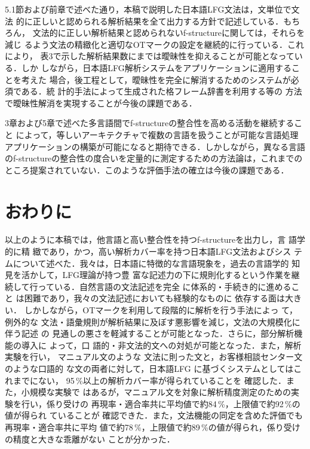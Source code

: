 5.1節および前章で述べた通り，本稿で説明した日本語LFG文法は，文単位で文法
的に正しいと認められる解析結果を全て出力する方針で記述している．もちろん，
文法的に正しい解析結果と認められないf-structureに関しては，それらを減じ
るよう文法の精緻化と適切なOTマークの設定を継続的に行っている．これにより，
表3で示した解析結果数にまでは曖昧性を抑えることが可能となっている．しか
しながら，日本語LFG解析システムをアプリケーションに適用することを考えた
場合，後工程として，曖昧性を完全に解消するためのシステムが必須である．統
計的手法によって生成された格フレーム辞書\cite{kawahara2002}を利用する等の
方法で曖昧性解消を実現することが今後の課題である．

3章および5章で述べた多言語間でf-structureの整合性を高める活動を継続すること
によって，等しいアーキテクチャで複数の言語を扱うことが可能な言語処理
アプリケーションの構築が可能になると期待できる．しかしながら，異なる言語
のf-structureの整合性の度合いを定量的に測定するための方法論は，これまでの
ところ提案されていない．このような評価手法の確立は今後の課題である．

\section{おわりに}
以上のように本稿では，他言語と高い整合性を持つf-structureを出力し，言
語学的に精\break
緻であり，かつ，高い解析カバー率を持つ日本語LFG文法およびシス
テムについて述べた．我々は，日本語に特徴的な言語現象を，過去の言語学的
知見を活かして，LFG理論が持つ豊\break
富な記述力の下に規則化するという作業を継
続して行っている．自然言語の文法記述を完全\break
に体系的・手続き的に進めること
は困難であり，我々の文法記述においても経験的なものに\break
依存する面は大きい．
しかしながら，OTマークを利用して段階的に解析を行う手法によっ\break
て，例外的な
文法・語彙規則が解析結果に及ぼす悪影響を減じ，文法の大規模化に伴う記述\break
の
見通しの悪さを軽減することが可能となった．さらに，部分解析機能の導入に
よって，口\break
語的・非文法的文への対処が可能となった．また，解析実験を行い，
マニュアル文のような\break
文法に則った文と，お客様相談センター文のような口語的
な文の両者に対して，日本語LFG\break
に基づくシステムとしてはこれまでにない，
95\,\%以上の解析カバー率が得られていることを\break
確認した．また，小規模な実験で
はあるが，マニュアル文を対象に解析精度測定のための実\break
験を行い，係り受けの
再現率・適合率共に平均値で約84\,\%，上限値で約92\,\%の値が得られ\break
ていることが
確認できた．また，文法機能の同定を含めた評価でも再現率・適合率共に平均\break
値で約78\,\%，上限値で約89\,\%の値が得られ，係り受けの精度と大きな乖離がない
ことが分かった．\break



